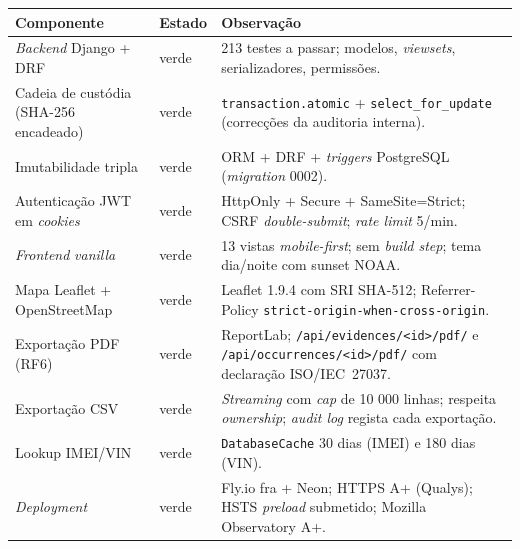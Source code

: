 \begin{longtable}{@{}L{4cm}L{2cm}L{8cm}@{}}
\toprule
\textbf{Componente} & \textbf{Estado} & \textbf{Observação} \\
\midrule
\endhead
\emph{Backend} Django + DRF                  & \textcolor{successgreen}{verde}  & 213 testes a passar; modelos, \emph{viewsets}, serializadores, permissões. \\
\midrule
Cadeia de custódia (SHA-256 encadeado)       & \textcolor{successgreen}{verde}  & \texttt{transaction.atomic} + \texttt{select\_for\_update} (correcções da auditoria interna). \\
\midrule
Imutabilidade tripla                         & \textcolor{successgreen}{verde}  & ORM + DRF + \emph{triggers} PostgreSQL (\emph{migration} 0002). \\
\midrule
Autenticação JWT em \emph{cookies}           & \textcolor{successgreen}{verde}  & HttpOnly + Secure + SameSite=Strict; CSRF \emph{double-submit}; \emph{rate limit} 5/min. \\
\midrule
\emph{Frontend} \emph{vanilla}               & \textcolor{successgreen}{verde}  & 13 vistas \emph{mobile-first}; sem \emph{build step}; tema dia/noite com sunset NOAA. \\
\midrule
Mapa Leaflet + OpenStreetMap                 & \textcolor{successgreen}{verde}  & Leaflet 1.9.4 com SRI SHA-512; Referrer-Policy \texttt{strict-origin-when-cross-origin}. \\
\midrule
Exportação PDF (RF6)                         & \textcolor{successgreen}{verde}  & ReportLab; \texttt{/api/evidences/<id>/pdf/} e \texttt{/api/occurrences/<id>/pdf/} com declaração ISO/IEC~27037. \\
\midrule
Exportação CSV                               & \textcolor{successgreen}{verde}  & \emph{Streaming} com \emph{cap} de 10 000 linhas; respeita \emph{ownership}; \emph{audit log} regista cada exportação. \\
\midrule
Lookup IMEI/VIN                              & \textcolor{successgreen}{verde}  & \texttt{DatabaseCache} 30 dias (IMEI) e 180 dias (VIN). \\
\midrule
\emph{Deployment}                            & \textcolor{successgreen}{verde}  & Fly.io fra + Neon; HTTPS A+ (Qualys); HSTS \emph{preload} submetido; Mozilla Observatory A+. \\

\end{longtable}
